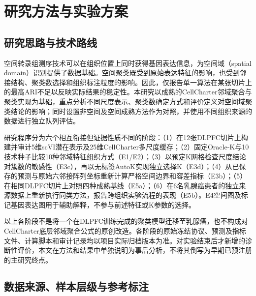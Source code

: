 \section{研究方法与实验方案}
\label{sec:cellcharter-methods-v1}

\subsection{研究思路与技术路线}
\label{subsec:cc-overview-v1}

空间转录组测序技术可以在组织位置上同时获得基因表达信息，为空间域（spatial domain）识别提供了数据基础。空间聚类既受到原始表达特征的影响，也受到邻接结构、聚类数选择和组织标注粒度的影响。因此，仅报告单一算法在某张切片上的最高ARI不足以反映实际结果的稳定性。本研究以成熟的CellCharter邻域聚合与聚类实现为基础，重点分析不同尺度表示、聚类数确定方式和评价定义对空间域聚类结论的影响；同时设置非空间及空间成熟方法作为对照，并使用不同组织来源的数据进行独立队列评估。

研究程序分为六个相互衔接但证据性质不同的阶段：（1）在12张DLPFC切片上构建并审计5维scVI潜在表示及25维CellCharter多尺度缓存；（2）固定Oracle-K与10技术种子比较10种邻域特征组织方式（E1/E2）；（3）以预定K网格检查尺度结论对簇数的敏感性（E3c），再以无标签AutoK实现独立选择K（E3d）；（4）从已保存的预测与原始六邻接阵列坐标重新计算严格空间边界和容差指标（E3b）；（5）在相同DLPFC切片上对照四种成熟基线（E5a）；（6）在6名乳腺癌患者的独立来源数据上重新执行同类方法，报告跨组织实验流程的表现（E5b）。E4空间图及标记基因表达图用于辅助解释，不参与前述特征或K参数的选择。

以上各阶段不是将一个在DLPFC训练完成的聚类模型迁移至乳腺癌，也不构成对CellCharter底层邻域聚合公式的原创改造。各阶段的原始冻结协议、预测及指标文件、计算脚本和审计记录均以项目实际归档版本为准。对实验结束后才新增的诊断性评价，本文在方法和结果中单独说明为事后分析，不将其倒写为早期已预注册的主研究终点。

\subsection{数据来源、样本层级与参考标注}
\label{subsec:cc-data-v1}

